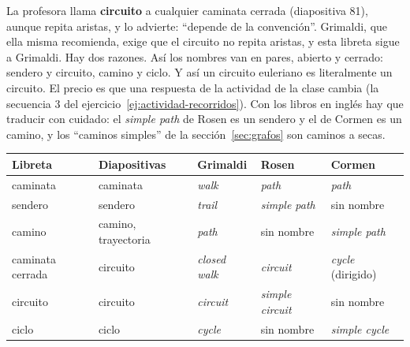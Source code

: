 \documentclass[11pt,letterpaper]{article}
\begin{document}
\begin{ojo}
  La profesora llama \textbf{circuito} a cualquier caminata cerrada
  (diapositiva 81), aunque repita aristas, y lo advierte: ``depende de
  la convención''. Grimaldi, que ella misma recomienda, exige que el
  circuito no repita aristas, y esta libreta sigue a Grimaldi. Hay dos
  razones. Así los nombres van en pares, abierto y cerrado:
  sendero y circuito, camino y ciclo. Y así un circuito euleriano es
  literalmente un circuito. El precio es que una respuesta de la
  actividad de la clase cambia (la secuencia 3 del
  ejercicio~\ref{ej:actividad-recorridos}). Con los libros en inglés
  hay que traducir con cuidado: el \textit{simple path} de Rosen es un
  sendero y el de Cormen es un camino, y los ``caminos simples'' de la
  sección~\ref{sec:grafos} son caminos a secas.\par
  \vspace{6pt}
  {\centering\small
  \begin{tabular}{lllll}
    \toprule
    \textbf{Libreta} & \textbf{Diapositivas} & \textbf{Grimaldi}
      & \textbf{Rosen} & \textbf{Cormen} \\
    \midrule
    caminata & caminata & \textit{walk} & \textit{path}
      & \textit{path} \\
    sendero & sendero & \textit{trail} & \textit{simple path}
      & sin nombre \\
    camino & camino, trayectoria & \textit{path} & sin nombre
      & \textit{simple path} \\
    caminata cerrada & circuito & \textit{closed walk}
      & \textit{circuit} & \textit{cycle} (dirigido) \\
    circuito & circuito & \textit{circuit} & \textit{simple circuit}
      & sin nombre \\
    ciclo & ciclo & \textit{cycle} & sin nombre
      & \textit{simple cycle} \\
    \bottomrule
  \end{tabular}\par}
\end{ojo}
\end{document}
